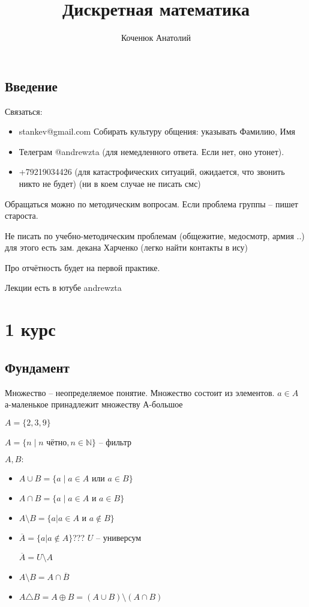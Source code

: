 \documentclass{book}
\author{Коченюк Анатолий}
\title{Дискретная математика }
\newcommand\N{\ensuremath{\mathbb{N}}}
\theoremstyle{definition}
\begin{document}
    \maketitle
    
    \section{Введение}
    Связаться:
    \begin{itemize}
        \item stankev@gmail.com Собирать культуру общения: указывать Фамилию, Имя
        \item Телеграм @andrewzta  (для немедленного ответа. Если нет, оно утонет).
        \item +79219034426 (для катастрофических ситуаций, ожидается, что звонить никто не будет) (ни в коем случае не писать смс)
    \end{itemize}

    Обращаться можно по методическим вопросам. Если проблема группы -- пишет староста.

    Не писать по учебно-методическим проблемам (общежитие, медосмотр, армия ..) для этого есть зам. декана Харченко (легко найти контакты в ису)

    Про отчётность будет на первой практике.

    Лекции есть в ютубе andrewzta
    \chapter{1 курс}
    \section{Фундамент}

        Множество -- неопределяемое понятие. Множество состоит из элементов. $a\in A$ а-маленькое принадлежит множеству А-большое

        $A = \{2, 3, 9\}$

        $A = \{n \mid n\text{ чётно}, n \in \N \}$ -- фильтр

        $A, B:$
        \begin{itemize}
            \item $A\cup B = \{a \mid a\in A \text{ или } a\in B\}$
            \item $A\cap B = \{a \mid a\in A \text{ и } a\in B\}$
            \item $A\setminus B = \{a | a\in A \text{ и } a\not\in B\}$
            \item $\overline{A} = \{a | a\not\in A\}$??? $U$ -- универсум

                $\overline{A} = U\setminus A$
            \item[] $A\setminus B = A\cap \overline{B}$
            \item $A \triangle B = A\oplus B = (A\cup  B)\setminus (A\cap B)$
        \end{itemize}
\end{document}

